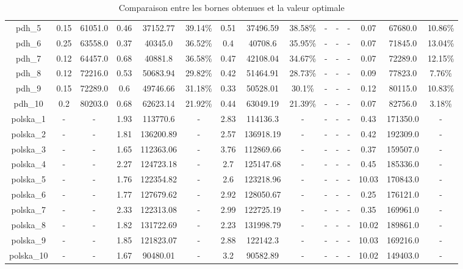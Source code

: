 \documentclass[main.tex]{subfiles}
\begin{document}
\begin{landscape}
\begin{table}[h]
{\begin{tabular}{c|cc|ccc|ccc|ccc|ccc}
	\hline
	pdh\_5 &0.15 &61051.0 &0.46 &37152.77 &39.14\% &0.51 &37496.59 &38.58\% &- &- &- &0.07 &67680.0 &10.86\%\\
	pdh\_6 &0.25 &63558.0 &0.37 &40345.0 &36.52\% &0.4 &40708.6 &35.95\% &- &- &- &0.07 &71845.0 &13.04\%\\
	pdh\_7 &0.12 &64457.0 &0.68 &40881.8 &36.58\% &0.47 &42108.04 &34.67\% &- &- &- &0.07 &72289.0 &12.15\%\\
	pdh\_8 &0.12 &72216.0 &0.53 &50683.94 &29.82\% &0.42 &51464.91 &28.73\% &- &- &- &0.09 &77823.0 &7.76\%\\
	pdh\_9 &0.15 &72289.0 &0.6 &49746.66 &31.18\% &0.33 &50528.01 &30.1\% &- &- &- &0.12 &80115.0 &10.83\%\\
	pdh\_10 &0.2 &80203.0 &0.68 &62623.14 &21.92\% &0.44 &63049.19 &21.39\% &- &- &- &0.07 &82756.0 &3.18\%\\
	polska\_1 &- &- &1.93 &113770.6 &- &2.83 &114136.3 &- &- &- &- &0.43 &171350.0 &-\\
	polska\_2 &- &- &1.81 &136200.89 &- &2.57 &136918.19 &- &- &- &- &0.42 &192309.0 &-\\
	polska\_3 &- &- &1.65 &112363.06 &- &3.76 &112869.66 &- &- &- &- &0.37 &159507.0 &-\\
	polska\_4 &- &- &2.27 &124723.18 &- &2.7 &125147.68 &- &- &- &- &0.45 &185336.0 &-\\
	polska\_5 &- &- &1.76 &122354.82 &- &2.6 &123218.96 &- &- &- &- &10.03 &170843.0 &-\\
	polska\_6 &- &- &1.77 &127679.62 &- &2.92 &128050.67 &- &- &- &- &0.25 &176121.0 &-\\
	polska\_7 &- &- &2.33 &122313.08 &- &2.99 &122725.19 &- &- &- &- &0.35 &169961.0 &-\\
	polska\_8 &- &- &1.82 &131722.69 &- &2.23 &131998.79 &- &- &- &- &10.02 &189861.0 &-\\
	polska\_9 &- &- &1.85 &121823.07 &- &2.88 &122142.3 &- &- &- &- &10.03 &169216.0 &-\\
	polska\_10 &- &- &1.67 &90480.01 &- &3.2 &90582.89 &- &- &- &- &10.02 &149403.0 &-\\
    \end{tabular}
}
\caption{Comparaison entre les bornes obtenues et la valeur optimale}
\end{table}
\end{landscape}
\end{document}
